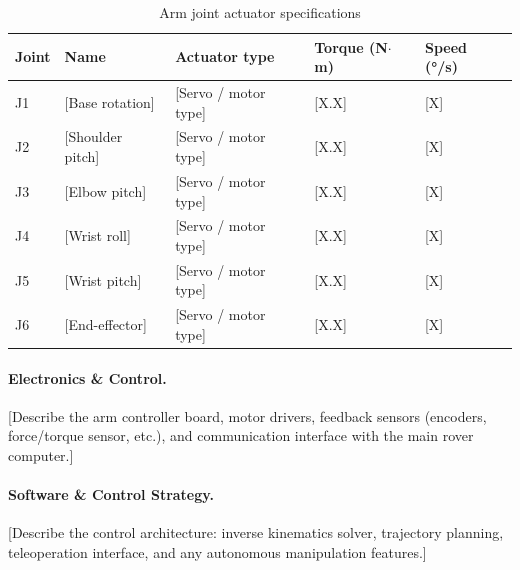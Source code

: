 \begin{table}[H]
    \centering
    \caption{Arm joint actuator specifications}
    \label{tab:arm_joints}
    \begin{tabular}{C{0.8cm} L{2.5cm} L{3cm} R{2.2cm} R{2.2cm}}
        \toprule
        \textbf{Joint} & \textbf{Name} & \textbf{Actuator type} & \textbf{Torque (N$\cdot$m)} & \textbf{Speed (°/s)} \\
        \midrule
        J1 & [Base rotation]    & [Servo / motor type] & [X.X] & [X] \\
        J2 & [Shoulder pitch]   & [Servo / motor type] & [X.X] & [X] \\
        J3 & [Elbow pitch]      & [Servo / motor type] & [X.X] & [X] \\
        J4 & [Wrist roll]       & [Servo / motor type] & [X.X] & [X] \\
        J5 & [Wrist pitch]      & [Servo / motor type] & [X.X] & [X] \\
        J6 & [End-effector]     & [Servo / motor type] & [X.X] & [X] \\
        \bottomrule
    \end{tabular}
\end{table}

\paragraph{Electronics \& Control.}
[Describe the arm controller board, motor drivers, feedback sensors (encoders,
force/torque sensor, etc.), and communication interface with the main rover
computer.]

\paragraph{Software \& Control Strategy.}
[Describe the control architecture: inverse kinematics solver, trajectory
planning, teleoperation interface, and any autonomous manipulation features.]

